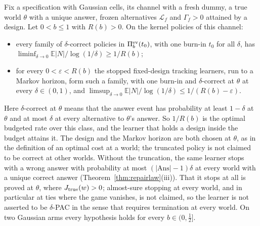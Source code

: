 \begin{theorem}
\label{thm:optrate}
Fix a specification with Gaussian cells, its channel with a fresh dummy, a true world $\theta$
with a unique answer, frozen alternatives $\mathcal L_f$ and $\Gamma_f>0$ attained by a design.
Let $0<b\le1$ with $R(b)>0$. On the kernel policies of this channel:
\begin{itemize}
\item every family of $\delta$-correct policies in $\Pi_b^{\rm ev}(t_0)$, with one burn-in $t_0$
for all $\delta$, has $\liminf_{\delta\to0}\mathbb E|N|/\log(1/\delta)\ge1/R(b)$;
\item for every $0<\varepsilon<R(b)$ the stopped fixed-design tracking learners, run to a Markov
horizon, form such a family, with one burn-in and $\delta$-correct at $\theta$ at every
$\delta\in(0,1)$, and
$\limsup_{\delta\to0}\mathbb E|N|/\log(1/\delta)\le1/(R(b)-\varepsilon)$.
\end{itemize}
Here $\delta$-correct at $\theta$ means that the answer event has probability at least $1-\delta$ at
$\theta$ and at most $\delta$ at every alternative to $\theta$'s answer. So $1/R(b)$ is the optimal
budgeted rate over this class, and the learner that holds a design inside the budget attains it.
The design and the Markov horizon are both chosen at $\theta$, as in the definition of an optimal
cost at a world; the truncated policy is not claimed to be correct at other worlds. Without the
truncation, the same learner stops with a wrong answer with probability at most
$(|\mathrm{Ans}|-1)\delta$ at every world with a unique correct answer
(Theorem~\ref{thm:repairlaw}(iii)). That it stops at all is proved at $\theta$, where
$J_{\rm true}(w)>0$; almost-sure stopping at every world, and in particular at ties where the game
vanishes, is not claimed, so the learner is not asserted to be $\delta$-PAC in the sense that
requires termination at every world. On two Gaussian arms every hypothesis holds for every
$b\in(0,\frac12]$.
\end{theorem}
